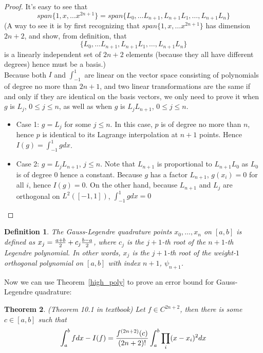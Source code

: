 \documentclass{article} %
\theoremstyle{break}
\newtheorem{definition}{Definition}[section]
\newtheorem{thm}[definition]{Theorem}
\begin{document}
  \begin{proof}
  It's easy to see that
  \[span\{1, x, \dots x^{2n+1}\}=span\{L_0, \dots L_{n+1}, L_{n+1}L_1, \dots, L_{n+1}L_n\}\]
  (A way to see it is by first recognizing that $span\{1, x, \dots x^{2n+1}\}$ has dimension $2n+2$, and show, from definition, that
  \[\{L_0, \dots L_{n+1}, L_{n+1}L_1, \dots, L_{n+1}L_n\}\]
  is a linearly independent set of $2n+2$ elements (because they all have different degrees) hence must be a basis.)\\


  Because both $I$ and $\int_{-1}^1$ are linear on the vector space consisting of polynomials of degree no more than $2n+1$, and two linear transformations are the same if and only if they are identical on the basis vectors, we only need to prove it when $g$ is $L_j$, $0\leq j\leq n$, as well as when $g$ is $L_jL_{n+1}$, $0\leq j\leq n$.
  \begin{itemize}
  \item Case 1: $g=L_j$ for some $j\leq n$. In this case, $p$ is of degree no more than $n$, hence $p$ is identical to its Lagrange interpolation at $n+1$ points. Hence $I(g)=\int_{-1}^1gdx$.
   \item Case 2: $g=L_jL_{n+1}$, $j\leq n$. Note that $L_{n+1}$ is proportional to $L_{n+1}L_0$ as $L_0$ is of degree $0$ hence a constant. Because $g$ has a factor $L_{n+1}$, $g(x_i)=0$ for all $i$, hence $I(g)=0$. On the other hand, because $L_ {n+1}$ and $L_j$ are orthogonal on $L^2([-1, 1])$, $\int_{-1}^1gdx=0$
  \end{itemize}
  \end{proof}

  \begin{definition}
  The Gauss-Legendre quadrature points $x_0,\dots, x_n$ on $[a, b]$ is defined as $x_j={a+b\over 2}+c_j{b-a\over 2}$, where $c_j$ is the $j+1$-th root of the $n+1$-th Legendre polynomial. In other words, $x_j$ is the $j+1$-th root of the weight-$1$ orthogonal polynomial on $[a, b]$ with index $n+1$, $\psi_{n+1}$.
\end{definition}

  Now we can use Theorem~\ref{high_poly} to prove an error bound for Gauss-Legendre quadrature:
  \begin{thm}(Theorem 10.1 in textbook)
    Let $f\in C^{2n+2}$, then there is some $c\in [a,  b]$ such that
    \[\int_a^bfdx-I(f)={f^{(2n+2)}(c)\over (2n+2)!}\int_a^b\prod_i(x-x_i)^2 dx\]
  \end{thm}
\end{document}
